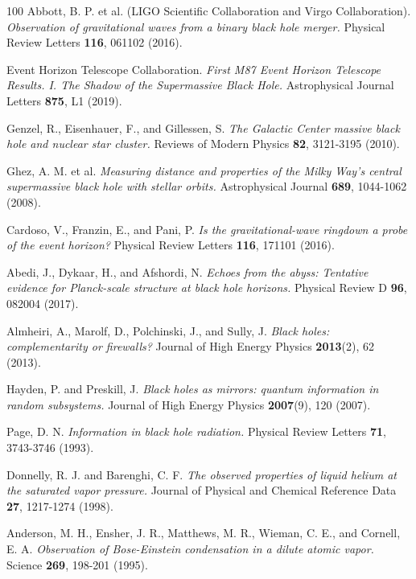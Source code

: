 \documentclass[11pt]{article}
\theoremstyle{definition}
\begin{document}
\begin{thebibliography}{100}
Abbott, B. P. et al. (LIGO Scientific Collaboration and Virgo Collaboration).
\textit{Observation of gravitational waves from a binary black hole merger.}
Physical Review Letters \textbf{116}, 061102 (2016).

Event Horizon Telescope Collaboration.
\textit{First M87 Event Horizon Telescope Results. I. The Shadow of the Supermassive Black Hole.}
Astrophysical Journal Letters \textbf{875}, L1 (2019).

Genzel, R., Eisenhauer, F., and Gillessen, S.
\textit{The Galactic Center massive black hole and nuclear star cluster.}
Reviews of Modern Physics \textbf{82}, 3121-3195 (2010).

Ghez, A. M. et al.
\textit{Measuring distance and properties of the Milky Way's central supermassive black hole with stellar orbits.}
Astrophysical Journal \textbf{689}, 1044-1062 (2008).

Cardoso, V., Franzin, E., and Pani, P.
\textit{Is the gravitational-wave ringdown a probe of the event horizon?}
Physical Review Letters \textbf{116}, 171101 (2016).

Abedi, J., Dykaar, H., and Afshordi, N.
\textit{Echoes from the abyss: Tentative evidence for Planck-scale structure at black hole horizons.}
Physical Review D \textbf{96}, 082004 (2017).

Almheiri, A., Marolf, D., Polchinski, J., and Sully, J.
\textit{Black holes: complementarity or firewalls?}
Journal of High Energy Physics \textbf{2013}(2), 62 (2013).

Hayden, P. and Preskill, J.
\textit{Black holes as mirrors: quantum information in random subsystems.}
Journal of High Energy Physics \textbf{2007}(9), 120 (2007).

Page, D. N.
\textit{Information in black hole radiation.}
Physical Review Letters \textbf{71}, 3743-3746 (1993).

Donnelly, R. J. and Barenghi, C. F.
\textit{The observed properties of liquid helium at the saturated vapor pressure.}
Journal of Physical and Chemical Reference Data \textbf{27}, 1217-1274 (1998).

Anderson, M. H., Ensher, J. R., Matthews, M. R., Wieman, C. E., and Cornell, E. A.
\textit{Observation of Bose-Einstein condensation in a dilute atomic vapor.}
Science \textbf{269}, 198-201 (1995).


\end{thebibliography}
\end{document}
